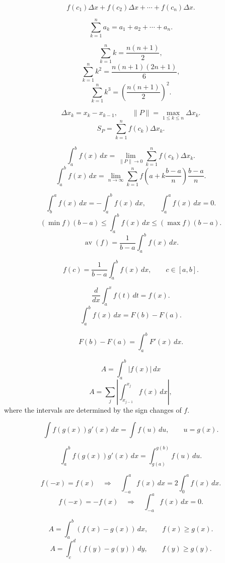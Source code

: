 \[
  f(c_1)\Delta x+f(c_2)\Delta x+\cdots+f(c_n)\Delta x.
\]

\[
  \sum_{k=1}^{n}a_k=a_1+a_2+\cdots+a_n.
\]

\[
  \sum_{k=1}^{n}k=\frac{n(n+1)}{2},
\]
\[
  \sum_{k=1}^{n}k^2=\frac{n(n+1)(2n+1)}{6},
\]
\[
  \sum_{k=1}^{n}k^3=\left(\frac{n(n+1)}{2}\right)^2.
\]

\[
  \Delta x_k=x_k-x_{k-1},
  \qquad
  \|P\|=\max_{1\le k\le n}\Delta x_k.
\]
\[
  S_P=\sum_{k=1}^{n}f(c_k)\Delta x_k.
\]

\[
  \int_a^b f(x)\,dx
  =
  \lim_{\|P\|\to0}\sum_{k=1}^{n}f(c_k)\Delta x_k.
\]
\[
  \int_a^b f(x)\,dx
  =
  \lim_{n\to\infty}\sum_{k=1}^{n}
  f\left(a+k\frac{b-a}{n}\right)\frac{b-a}{n}.
\]

\[
  \int_b^a f(x)\,dx=-\int_a^b f(x)\,dx,
  \qquad
  \int_a^a f(x)\,dx=0.
\]
\[
  (\min f)(b-a)
  \le
  \int_a^b f(x)\,dx
  \le
  (\max f)(b-a).
\]
\[
  \operatorname{av}(f)
  =
  \frac{1}{b-a}\int_a^b f(x)\,dx.
\]

\[
  f(c)=\frac{1}{b-a}\int_a^b f(x)\,dx,
  \qquad c\in[a,b].
\]

\[
  \frac{d}{dx}\int_a^x f(t)\,dt=f(x).
\]
\[
  \int_a^b f(x)\,dx=F(b)-F(a).
\]

\[
  F(b)-F(a)=\int_a^b F'(x)\,dx.
\]

\[
  A=\int_a^b |f(x)|\,dx
\]
\[
  A=\sum_j\left|\int_{x_{j-1}}^{x_j}f(x)\,dx\right|,
\]
where the intervals are determined by the sign changes of \(f\).

\[
  \int f(g(x))g'(x)\,dx=\int f(u)\,du,
  \qquad u=g(x).
\]

\[
  \int_a^b f(g(x))g'(x)\,dx
  =
  \int_{g(a)}^{g(b)}f(u)\,du.
\]

\[
  f(-x)=f(x)
  \quad\Longrightarrow\quad
  \int_{-a}^{a}f(x)\,dx=2\int_0^a f(x)\,dx.
\]
\[
  f(-x)=-f(x)
  \quad\Longrightarrow\quad
  \int_{-a}^{a}f(x)\,dx=0.
\]

\[
  A=\int_a^b\left(f(x)-g(x)\right)\,dx,
  \qquad f(x)\ge g(x).
\]
\[
  A=\int_c^d\left(f(y)-g(y)\right)\,dy,
  \qquad f(y)\ge g(y).
\]

